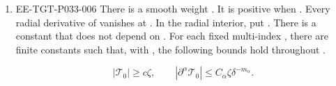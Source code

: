 \begin{theorem}
\begin{enumerate}[label=(\roman*)]
\item
\begin{EESegment}{EE-TGT-P033-006}
There is a smooth weight . It is positive when
.
Every radial derivative of  vanishes at
. In the radial interior, put
. There is a
constant  that does not depend on
. For each fixed multi-index
, there are finite constants
 such that, with
,
the following bounds hold throughout
.
\end{EESegment}
\begin{equation}
  |\mathcal{T}_0|\geq c\zeta,\qquad
  |\partial^\alpha\mathcal{T}_0|\leq C_\alpha\zeta\delta^{-m_\alpha}.
  \tag{4.27}\label{eq:4.27}
\end{equation}


\end{enumerate}
\end{theorem}
